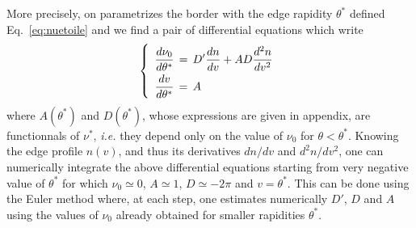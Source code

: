 \documentclass[submission, Phys]{SciPost}
\begin{document}
More precisely, on parametrizes the border with the edge rapidity $\theta^*$ defined Eq.~\eqref{eq:nuetoile} and we find  a pair of differential equations which write %
\begin{equation}
	\label{eq:dndtheta}
    \renewcommand{\arraystretch}{2}
	\left \{ \begin{array}{l}\displaystyle\frac{d \nu_0}{d \theta^*}  \, = \, D'  \frac{dn}{dv} + AD \frac{d^2 n}{d v^2} \\
    \displaystyle\frac{d v}{d \theta^*}  \, = \, A \end{array}\right .
\end{equation}
where  $A(\theta^*)$ and $D(\theta^*)$, whose expressions are given in appendix, are functionnals of $\nu^*$, {\it i.e.} they depend only on the value of $\nu_0$ for $\theta<\theta^*$. 
Knowing the edge profile $n(v)$, and thus its derivatives $dn/dv$ and $d^2n/dv^2$, one can numerically integrate the above differential equations
starting from very negative value of $\theta^*$ for which $\nu_0\simeq 0$, $A\simeq 1$,
 $D\simeq -2\pi$ and $v=\theta^*$. This can be done using the Euler method where, at each step, one estimates numerically
$D'$, 
$D$ and $A$  using the values of $\nu_0$ already obtained for smaller rapidities $\theta^*$. 

\end{document}
